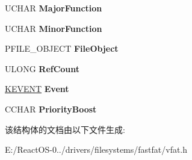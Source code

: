 \begin{DoxyCompactItemize}
\item 
\mbox{\label{struct_v_f_a_t___i_r_p___c_o_n_t_e_x_t_a4017e163bd98ba206ee41ec748f2fd2a}} 
U\+C\+H\+AR {\bfseries Major\+Function}
\item 
\mbox{\label{struct_v_f_a_t___i_r_p___c_o_n_t_e_x_t_a1952d9db9ac09de62c28c99f497e9cf6}} 
U\+C\+H\+AR {\bfseries Minor\+Function}
\item 
\mbox{\label{struct_v_f_a_t___i_r_p___c_o_n_t_e_x_t_adcf12a8ec9bf53095e021c9c80fcd433}} 
P\+F\+I\+L\+E\+\_\+\+O\+B\+J\+E\+CT {\bfseries File\+Object}
\item 
\mbox{\label{struct_v_f_a_t___i_r_p___c_o_n_t_e_x_t_acf35ed23a3178aa346e8d11b22a41fb4}} 
U\+L\+O\+NG {\bfseries Ref\+Count}
\item 
\mbox{\label{struct_v_f_a_t___i_r_p___c_o_n_t_e_x_t_a54316139f643f2fa8acf55a892215e05}} 
\hyperlink{struct___k_e_v_e_n_t}{K\+E\+V\+E\+NT} {\bfseries Event}
\item 
\mbox{\label{struct_v_f_a_t___i_r_p___c_o_n_t_e_x_t_a1e23157d5de4cc2e9971eba0d5fc05af}} 
C\+C\+H\+AR {\bfseries Priority\+Boost}
\end{DoxyCompactItemize}


该结构体的文档由以下文件生成\+:\begin{DoxyCompactItemize}
\item 
E\+:/\+React\+O\+S-\/0../drivers/filesystems/fastfat/vfat.\+h\end{DoxyCompactItemize}
